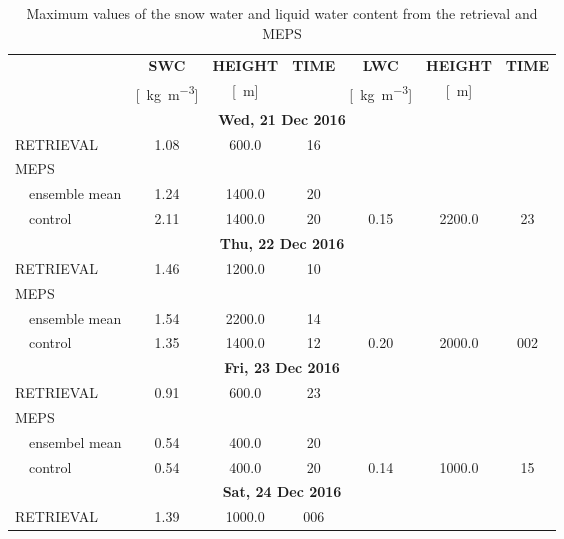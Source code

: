 \begin{table}[h!]
	\begin{center}
		\caption{Maximum values of the snow water and liquid water content from the retrieval and MEPS}\label{tab:max_val}
		\begin{tabular}{ll|c|c|c|c|c|c} 
			\hline \hline
			& & \textbf{SWC}  & \textbf{HEIGHT}  & \textbf{TIME} & \textbf{LWC}  & \textbf{HEIGHT}  & \textbf{TIME}  \\
			& & [\SI{}{\kg\per\cubic\meter}] & [\SI{}{\meter}] &  & [\SI{}{\kg\per\cubic\meter}] & [\SI{}{\meter}] &   \\
			\hline \hline
			\multicolumn{8}{c}{\textbf{Wed, 21 Dec 2016}} \\ \hline
			\multicolumn{2}{l|}{RETRIEVAL} & 1.08 & 600.0 & \SI{16}{\UTC} & & & \\
			\multicolumn{2}{l|}{MEPS} &  &  & & & & \\
			& ensemble mean & \num{1.24} & \num{1400.0} & \SI{20}{\UTC} & & & \\
			& control & \num{2.11} & \num{1400.0} & \SI{20}{\UTC} & \num{0.15} & \num{2200.0} & \SI{23}{\UTC}\\ \hline \hline
			\multicolumn{8}{c}{\textbf{Thu, 22 Dec 2016}} \\ \hline
			\multicolumn{2}{l|}{RETRIEVAL} & \num{1.46} & \num{1200.0} & \SI{10}{\UTC} & & & \\
			\multicolumn{2}{l|}{MEPS} &  &  & & & & \\
			& ensemble mean & \num{1.54} & \num{2200.0} & \SI{14}{\UTC} & & & \\
			& control & \num{1.35} & \num{1400.0} & \SI{12}{\UTC} & \num{0.20} & \num{2000.0} & 0\SI{02}{\UTC} \\ \hline \hline
			\multicolumn{8}{c}{\textbf{Fri, 23 Dec 2016}} \\ \hline
			\multicolumn{2}{l|}{RETRIEVAL} & \num{0.91} & \num{600.0} & \SI{23}{\UTC} & & & \\
			\multicolumn{2}{l|}{MEPS} &  &  & & & & \\
			& ensembel mean & \num{0.54} & \num{400.0} & \SI{20}{\UTC} & & & \\
			& control & \num{0.54} & \num{400.0} & \SI{20}{\UTC} & \num{0.14} & \num{1000.0} & \SI{15}{\UTC} \\ \hline \hline
			\multicolumn{8}{c}{\textbf{Sat, 24 Dec 2016}} \\ \hline
			\multicolumn{2}{l|}{RETRIEVAL} & \num{1.39} & \num{1000.0} & 0\SI{06}{\UTC} & & & \\

\end{tabular}
\end{center}
\end{table}
